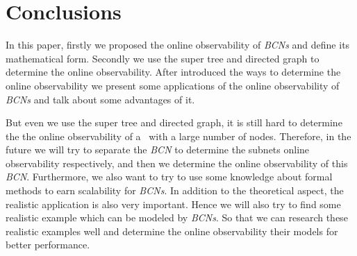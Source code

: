 \section{Conclusions}
\label{sec:con}

In this paper, firstly we proposed the online observability of {\em BCNs} and define its mathematical form. Secondly we use the super tree and directed graph to determine the online observability. After introduced the ways to determine the online observability we present some applications of the online observability of {\em BCNs} and talk about some advantages of it. %

But even we use the super tree and directed graph, it is still hard to determine the  the online observability of a \BCN\ with a large number of nodes. Therefore, in the future we will try to separate the {\em BCN} to determine the subnets online observability respectively, and then we determine the online observability of this {\em BCN}. Furthermore, we also want to try to use some knowledge about formal methods to earn scalability for {\em BCNs}. In addition to the theoretical aspect, the realistic application is also very important. Hence we will also try to find some realistic example which can be modeled by {\em BCNs}. So that we can research these realistic examples well and determine the online observability their models for better performance.